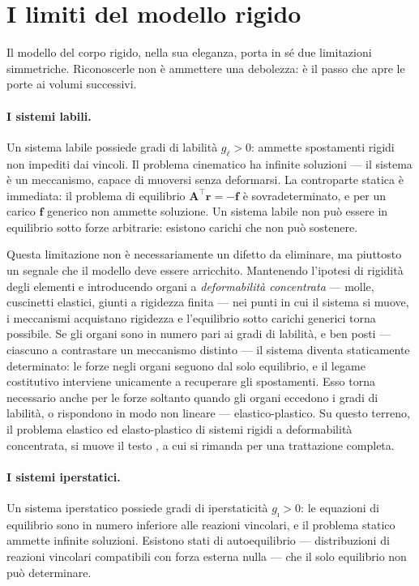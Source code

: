 \section*{I limiti del modello rigido}

Il modello del corpo rigido, nella sua eleganza, porta in sé due limitazioni simmetriche. Riconoscerle non è ammettere una debolezza: è il passo che apre le porte ai volumi successivi.

\paragraph{I sistemi labili.}
Un sistema labile possiede gradi di labilità $g_\ell > 0$: ammette spostamenti rigidi non impediti dai vincoli. Il problema cinematico ha infinite soluzioni --- il sistema è un meccanismo, capace di muoversi senza deformarsi. La controparte statica è immediata: il problema di equilibrio $\bm{A}^\top \bm{r} = -\bm{f}$ è sovradeterminato, e per un carico $\bm{f}$ generico non ammette soluzione. Un sistema labile non può essere in equilibrio sotto forze arbitrarie: esistono carichi che non può sostenere.

Questa limitazione non è necessariamente un difetto da eliminare, ma piuttosto un segnale che il modello deve essere arricchito. Mantenendo l'ipotesi di rigidità degli elementi e introducendo organi a \textit{deformabilità concentrata} --- molle, cuscinetti elastici, giunti a rigidezza finita --- nei punti in cui il sistema si muove, i meccanismi acquistano rigidezza e l'equilibrio sotto carichi generici torna possibile. Se gli organi sono in numero pari ai gradi di labilità, e ben posti --- ciascuno a contrastare un meccanismo distinto --- il sistema diventa staticamente determinato: le forze negli organi seguono dal solo equilibrio, e il legame costitutivo interviene unicamente a recuperare gli spostamenti. Esso torna necessario anche per le forze soltanto quando gli organi eccedono i gradi di labilità, o rispondono in modo non lineare --- elastico-plastico. Su questo terreno, il problema elastico ed elasto-plastico di sistemi rigidi a deformabilità concentrata, si muove il testo \cite{LPDN}, a cui si rimanda per una trattazione completa.


\paragraph{I sistemi iperstatici.}
Un sistema iperstatico possiede gradi di iperstaticità $g_\imath > 0$: le equazioni di equilibrio sono in numero inferiore alle  reazioni vincolari, e il problema statico ammette infinite soluzioni. Esistono stati di autoequilibrio --- distribuzioni di reazioni vincolari compatibili con forza esterna nulla --- che il solo equilibrio non può determinare.


